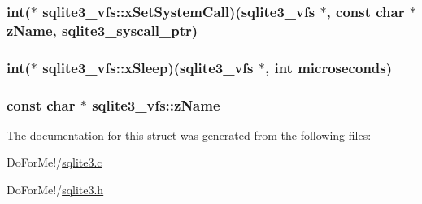 \hypertarget{structsqlite3__vfs_a69996d40229d6eabe6869bb3fc80b730}{
\subsubsection[{x\-Set\-System\-Call}]{\setlength{\rightskip}{0pt plus 5cm}int($\ast$ sqlite3\-\_\-vfs\-::x\-Set\-System\-Call)({\bf sqlite3\-\_\-vfs} $\ast$, const char $\ast${\bf z\-Name}, {\bf sqlite3\-\_\-syscall\-\_\-ptr})}}\label{structsqlite3__vfs_a69996d40229d6eabe6869bb3fc80b730}
\hypertarget{structsqlite3__vfs_a8ebcfaceced9713024cb8e2508fe6c1b}{
\subsubsection[{x\-Sleep}]{\setlength{\rightskip}{0pt plus 5cm}int($\ast$ sqlite3\-\_\-vfs\-::x\-Sleep)({\bf sqlite3\-\_\-vfs} $\ast$, int microseconds)}}\label{structsqlite3__vfs_a8ebcfaceced9713024cb8e2508fe6c1b}
\hypertarget{structsqlite3__vfs_a01a82d3e1a7efc00a762a00751ed592b}{
\subsubsection[{z\-Name}]{\setlength{\rightskip}{0pt plus 5cm}const char $\ast$ sqlite3\-\_\-vfs\-::z\-Name}}\label{structsqlite3__vfs_a01a82d3e1a7efc00a762a00751ed592b}


The documentation for this struct was generated from the following files\-:\begin{DoxyCompactItemize}
\item 
Do\-For\-Me!/\hyperlink{sqlite3_8c}{sqlite3.\-c}\item 
Do\-For\-Me!/\hyperlink{sqlite3_8h}{sqlite3.\-h}\end{DoxyCompactItemize}

